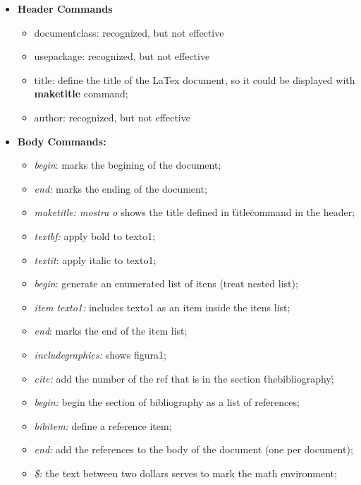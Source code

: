 \documentclass{article}
\begin{document}
\begin{itemize}

	\item \textbf{Header Commands}
		\begin{itemize}
			 \item documentclass: recognized, but not effective
			 \item usepackage:  recognized, but not effective
			 \item title: define the title of the LaTex document, so it could be displayed with \textbf{maketitle} command;
			 \item author: recognized, but not effective
		\end{itemize}

	\item \textbf{Body Commands:}
		\begin{itemize}
	 		\item \textit{begin}: marks the begining of the document;
	 		\item \textit{end:} marks the ending of the document;
	 		\item \textit{maketitle: mostra o} shows the title defined in \"title\" command in the header;
	 		\item \textit{textbf:} apply bold to texto1;
	 		\item \textit{textit}: apply italic to texto1;
	 		\item \textit{begin}: generate an enumerated list of itens (treat nested list);
	 		\item \textit{item texto1:} includes texto1 as an item inside the itens list; 
	 		\item \textit{end}: marks the end of the item list;
	 		\item \textit{includegraphics:} shows figura1;
	 		\item \textit{cite:} add the number of the ref that is in the section \'thebibliography\';
	 		\item \textit{begin:} begin the section of bibliography as a list of references;
	 		\item \textit{bibitem:} define a reference item;
	 		\item \textit{end:} add the references to the body of the document (one per document);
	 		\item \textit{\$:} the text between two dollars serves to mark the math environment;
		\end{itemize}

\end{itemize}
\end{document}
